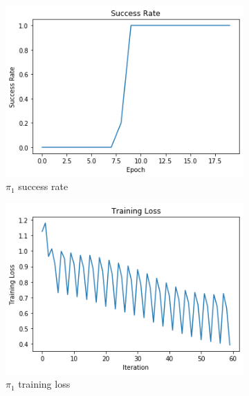 \documentclass{article}
\begin{document}
\begin{figure}[h!]
\begin{subfigure}[b]{0.3\textwidth}
         	\centering
         	\includegraphics[width=\textwidth]
         	{images/success_rate_1}
         	\caption{$\pi_1$ success rate}
         	\label{fig:pi_1_reward}
     	\end{subfigure}
     	\hfill
     	\begin{subfigure}[b]{0.3\textwidth}
         	\centering
         	\includegraphics[width=\textwidth]
         	{images/training_loss_1}
         	\caption{$\pi_1$ training loss}
         	\label{fig:pi_1_reward}
     	\end{subfigure}
     	\centering
     	\begin{subfigure}[b]{0.3\textwidth}
         	\centering

\end{subfigure}
\end{figure}
\end{document}
